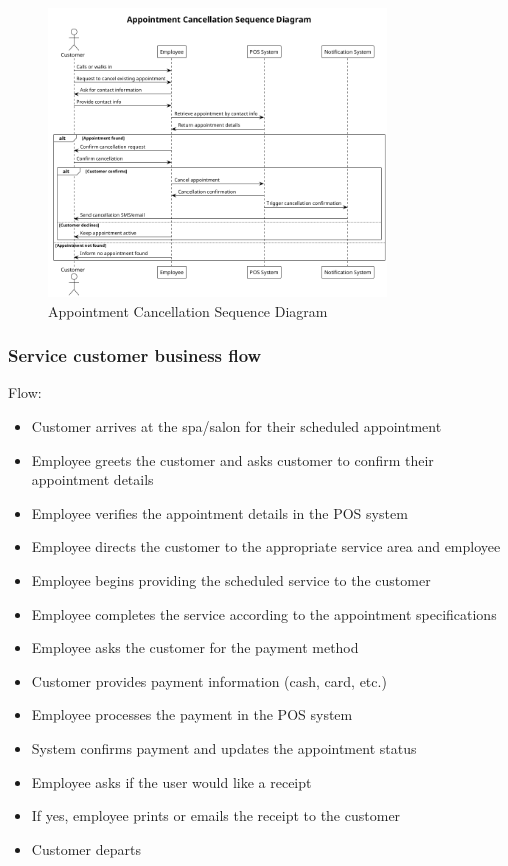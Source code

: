 \documentclass[]{VUMIFTemplateClass}
\begin{document}
\begin{figure}[H]
    \centering
    \includegraphics[width=0.8\textwidth]{images/diagrams/services/appointment_cancellation_sequence.png}
    \caption{Appointment Cancellation Sequence Diagram}
    \label{fig:appointment_cancellation_sequence}
\end{figure}


\subsubsection{Service customer business flow}

Flow:
\begin{itemize}
    \setlength{\itemsep}{2pt}
    \setlength{\parskip}{0pt}
    \setlength{\parsep}{0pt}
    \item Customer arrives at the spa/salon for their scheduled appointment
    \item Employee greets the customer and asks customer to confirm their appointment details
    \item Employee verifies the appointment details in the POS system
    \item Employee directs the customer to the appropriate service area and employee
    \item Employee begins providing the scheduled service to the customer
    \item Employee completes the service according to the appointment specifications
    \item Employee asks the customer for the payment method 
    \item Customer provides payment information (cash, card, etc.)
    \item Employee processes the payment in the POS system
    \item System confirms payment and updates the appointment status
    \item Employee asks if the user would like a receipt
    \item If yes, employee prints or emails the receipt to the customer
    \item Customer departs
\end{itemize}
\end{document}
